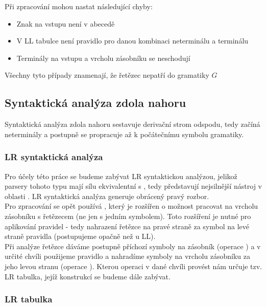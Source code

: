 \noindent
Při zpracování mohou nastat následující chyby:

\begin{itemize}
  \item Znak na vstupu není v abecedě
  \item V LL tabulce není pravidlo pro danou kombinaci neterminálu a terminálu
  \item Terminály na vstupu a vrcholu zásobníku se neschodují
\end{itemize}

\noindent
Všechny tyto případy znamenají, že řetězec nepatří do gramatiky $G$

\subsection{Syntaktická analýza zdola nahoru}

Syntaktická analýza zdola nahoru sestavuje derivační strom odspodu,
tedy začíná neterminály a postupně se propracuje až k počátečnímu symbolu
gramatiky.


\subsubsection*{LR syntaktická analýza}
Pro účely této práce se budeme zabývat LR syntaktickou analýzou, jelikož
parsery tohoto typu mají sílu ekvivalentní s \cite[str. 155]{MedunaIFJ}, tedy představují nejsilnější nástroj
v oblasti .
LR syntaktická analýza generuje obrácený pravý rozbor.\\

Pro zpracování se opět používá , který je
rozšířen o možnost pracovat na vrcholu zásobníku s řetězecem (ne jen s jedním symbolem).
Toto rozšíření je nutné pro aplikování pravidel - tedy nahrazení řetězce na pravé straně za
symbol na levé straně pravidla (postupujeme opačně než u LL).\\

Při analýze řetězce dáváme postupně příchozí symboly na zásobník (operace )
a v určité chvíli použijeme pravidlo a nahradíme symboly na vrcholu zásobníku za
jeho levou stranu (operace ). Kterou operaci v dané chvíli provést
nám určuje tzv. LR tabulka, jejíž konstrukcí se budeme dále zabývat.\\

\subsubsection*{LR tabulka}

